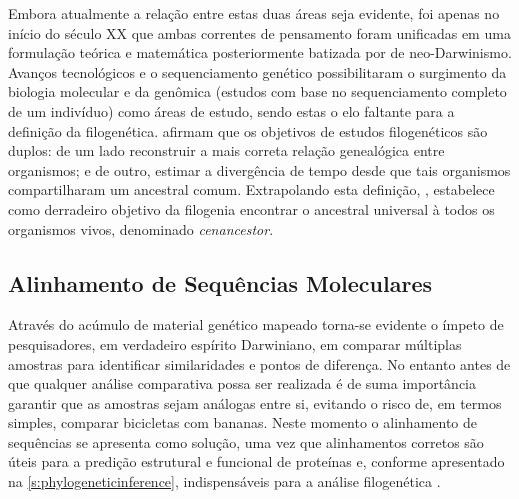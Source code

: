 \documentclass[english,brazilian]{UNISINOSmonografia} %
\begin{document}
Embora atualmente a relação entre estas duas áreas seja evidente, foi apenas no início do século XX que ambas correntes de pensamento foram unificadas em uma formulação teórica e matemática posteriormente batizada por  de neo-Darwinismo.
Avanços tecnológicos e o sequenciamento genético possibilitaram o surgimento da biologia molecular e da genômica (estudos com base no sequenciamento completo de um indivíduo) como áreas de estudo, sendo estas o elo faltante para a definição da filogenética.
 afirmam que os objetivos de estudos filogenéticos são duplos: de um lado reconstruir a mais correta relação genealógica entre organismos; e de outro, estimar a divergência de tempo desde que tais organismos compartilharam um ancestral comum.
Extrapolando esta definição, , estabelece como derradeiro objetivo da filogenia encontrar o ancestral universal à todos os organismos vivos, denominado \textit{cenancestor}.




\subsection{Alinhamento de Sequências Moleculares}


Através do acúmulo de material genético mapeado torna-se evidente o ímpeto de pesquisadores, em verdadeiro espírito Darwiniano, em comparar múltiplas amostras para identificar similaridades e pontos de diferença.
No entanto antes de que qualquer análise comparativa possa ser realizada é de suma importância garantir que as amostras sejam análogas entre si, evitando o risco de, em termos simples, comparar bicicletas com bananas.
Neste momento o alinhamento de sequências se apresenta como solução, uma vez que alinhamentos corretos são úteis para a predição estrutural e funcional de proteínas e, conforme apresentado na \autoref{s:phylogeneticinference}, indispensáveis para a análise filogenética \cite{biofordummies2007}.


\end{document}
